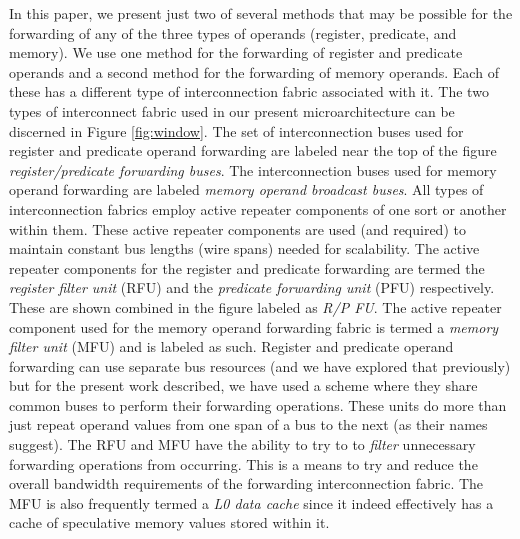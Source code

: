 \documentclass[10pt,dvips]{article}
\begin{document}
In this paper, we present just two of several methods that
may be possible for the forwarding of any of the three types of
operands (register, predicate, and memory).
We use one method for the forwarding of register and predicate
operands and a second method for the forwarding of memory 
operands.
Each of these has a different type of interconnection fabric
associated with it.
The two types of interconnect fabric used 
in our present microarchitecture
can be discerned
in Figure \ref{fig:window}.
The set of interconnection buses used for register and predicate
operand forwarding are labeled near the top of the 
figure \textit{register/predicate forwarding buses}.
The interconnection buses used for memory operand forwarding
are labeled \textit{memory operand broadcast buses}.
All types of interconnection fabrics employ active repeater
components of one sort or another within them.
These active repeater components are
used (and required) to maintain constant bus lengths
(wire spans) needed for scalability.
The active repeater components for the register and
predicate forwarding are termed 
the \textit{register filter unit} (RFU)
and the \textit{predicate forwarding unit} (PFU)
respectively.  
These are shown combined in the figure
labeled as \textit{R/P FU}.
The active repeater component used for the memory
operand forwarding fabric is termed a \textit{memory filter unit} (MFU)
and is labeled as such.
Register and predicate operand forwarding can
use separate bus resources (and we have explored that previously) but
for the present work described, we have used a scheme where
they share common buses to perform their forwarding operations.
These units do more than just repeat operand values from
one span of a bus to the next (as their names suggest).
The RFU and MFU have the ability to try to
to \textit{filter} unnecessary forwarding operations from
occurring.  This is a means to try and reduce the overall bandwidth
requirements of the forwarding interconnection fabric.
The MFU is also frequently termed a \textit{L0 data cache}
since it indeed effectively has a cache of speculative
memory values stored within it.
\end{document}
